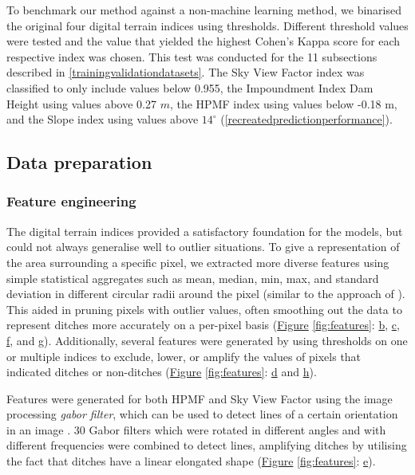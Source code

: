 \documentclass[11pt, review]{elsarticle} %
\begin{document}
To benchmark our method against a non-machine learning method, we binarised the original four digital terrain indices using thresholds. Different threshold values were tested and the value that yielded the highest Cohen's Kappa score for each respective index was chosen. This test was conducted for the 11 subsections described in \ref{trainingvalidationdatasets}. The Sky View Factor index was classified to only include values below 0.955, the Impoundment Index Dam Height using values above 0.27 $m$, the HPMF index using values below -0.18 m, and the Slope index using values above $14 ^{\circ}$ (\autoref{recreatedpredictionperformance}).

\subsection{Data preparation}

\subsubsection{Feature engineering}

The digital terrain indices provided a satisfactory foundation for the models, but could not always generalise well to outlier situations. To give a representation of the area surrounding a specific pixel, we extracted more diverse features using simple statistical aggregates such as mean, median, min, max, and standard deviation in different circular radii around the pixel (similar to the approach of \citet{roelens}). This aided in pruning pixels with outlier values, often smoothing out the data to represent ditches more accurately on a per-pixel basis (\hyperref[fig:features]{Figure} \ref{fig:features}: \hyperref[fig:features]{b}, \hyperref[fig:features]{c}, \hyperref[fig:features]{f}, and \hyperref[fig:features]{g}). Additionally, several features were generated by using thresholds on one or multiple indices to exclude, lower, or amplify the values of pixels that indicated ditches or non-ditches (\hyperref[fig:features]{Figure} \ref{fig:features}: \hyperref[fig:features]{d} and \hyperref[fig:features]{h}).

Features were generated for both HPMF and Sky View Factor using the image processing \textit{gabor filter}, which can be used to detect lines of a certain orientation in an image \citep{gabor}. 30 Gabor filters which were rotated in different angles and with different frequencies were combined to detect lines, amplifying ditches by utilising the fact that ditches have a linear elongated shape (\hyperref[fig:features]{Figure} \ref{fig:features}: \hyperref[fig:features]{e}).
\end{document}
